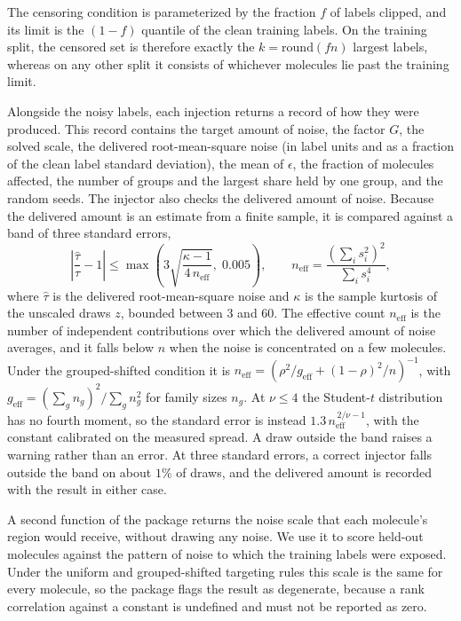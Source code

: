 The censoring condition is parameterized by the fraction $f$ of labels clipped, and its limit is the $(1-f)$ quantile
of the clean training labels. On the training split, the censored
set is therefore exactly the $k = \mathrm{round}(fn)$ largest labels, whereas on any other split it consists of whichever
molecules lie past the training limit.

Alongside the noisy labels, each injection returns a record of how they were produced. This record contains the target amount of noise, the factor
$G$, the solved scale, the delivered root-mean-square noise (in label units and as a fraction of the
clean label standard deviation), the mean of $\epsilon$, the fraction of molecules affected, the
number of groups and the largest share held by one group, and the random seeds. The injector also checks the delivered amount of noise.
Because the delivered amount is an estimate from a finite sample, it is compared against a band of three
standard errors,
\begin{equation}
\left|\frac{\hat{\tau}}{\tau} - 1\right| \le \max\!\left(3\sqrt{\frac{\kappa - 1}{4\,n_{\mathrm{eff}}}},\; 0.005\right),
\qquad
n_{\mathrm{eff}} = \frac{\left(\sum_i s_i^2\right)^2}{\sum_i s_i^4},
\label{eq:dose_tolerance}
\end{equation}
where $\hat{\tau}$ is the delivered root-mean-square noise and $\kappa$ is the sample kurtosis of the
unscaled draws $z$, bounded between 3 and 60. The effective count $n_{\mathrm{eff}}$ is the number of
independent contributions over which the delivered amount of noise averages, and it falls below $n$ when the noise is
concentrated on a few molecules. Under the grouped-shifted condition it is
$n_{\mathrm{eff}} = \left(\rho^2/g_{\mathrm{eff}} + (1-\rho)^2/n\right)^{-1}$, with
$g_{\mathrm{eff}} = \left(\sum_g n_g\right)^2 / \sum_g n_g^2$ for family sizes $n_g$. At
$\nu \le 4$ the Student-$t$ distribution has no fourth moment, so the standard error is instead
$1.3\,n_{\mathrm{eff}}^{\,2/\nu - 1}$, with the constant calibrated on the measured spread. A draw
outside the band raises a warning rather than an error. At three standard errors, a correct injector
falls outside the band on about $1\%$ of draws, and the delivered amount is recorded with the result
in either case.

A second function of the package returns the noise scale that each molecule's region would receive, without drawing any noise.
We use it to score held-out molecules against the pattern of noise to which the training labels were exposed. Under the
uniform and grouped-shifted targeting rules this scale is the same for every molecule, so the package flags the result
as degenerate, because a rank correlation against a constant is undefined and must not be reported as zero.

